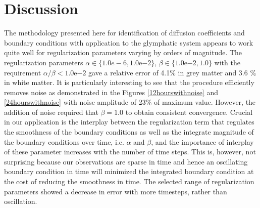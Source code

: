 \documentclass[11pt,a4paper]{article}
\begin{document}
%
% 

\section{Discussion}
The methodology presented here for identification of diffusion coefficients and boundary conditions with application to the glymphatic system appears to work quite 
well for regularization parameters varying by orders of magnitude. The regularization parameters  $\alpha \in \lbrace 1.0e-6, 1.0\mathrm{e}{-2} \rbrace$, $\beta \in \lbrace 1.0\mathrm{e}{-2} , 1.0 \rbrace$ with the requirement $\alpha / \beta < 1.0\mathrm{e}{-2}$ gave a relative error of  
4.1\% in grey matter and 3.6 \% in white matter. It is particularly interesting to see that the procedure efficiently removes noise as demonstrated
in the Figures \ref{12hourswithnoise} and \ref{24hourswithnoise} with noise amplitude of 23\% of maximum value. However, the addition of noise required that $\beta = 1.0 $ to obtain consistent convergence. 
Crucial in our application is the interplay between the regularization term that regulates the smoothness of the boundary conditions as well as
the integrate magnitude of the boundary conditions over time, i.e. $\alpha$ and $\beta$, and the
importance of interplay of these parameter increases with the number of time steps. This is, however, not surprising because our observations are sparse
in time and hence an oscillating boundary condition in time will minimized the integrated boundary condition at the cost of reducing the smoothness in time. The selected range of regularization parameters showed a decrease in error with more timesteps, rather than oscillation.     
\end{document}
